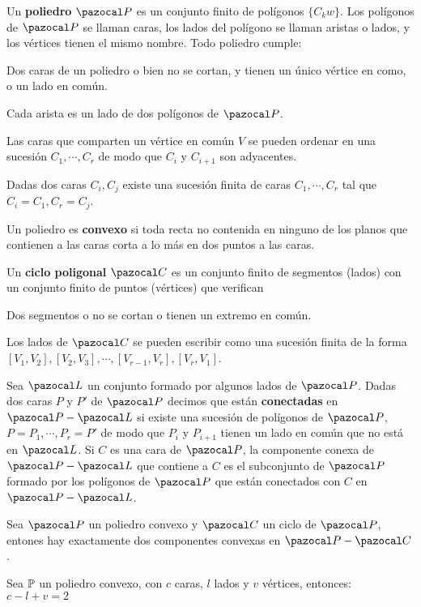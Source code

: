  Un \textbf{poliedro} $\PP$ es un conjunto finito de polígonos $\{C_kw\}$. Los polígonos de $\PP$ se llaman caras, los lados del polígono se llaman aristas o lados, y los vértices tienen el mismo nombre. Todo poliedro cumple:
\begin{itemizex}
	\item Dos caras de un poliedro o bien no se cortan, y tienen un único vértice en como, o un lado en común.
	\item Cada arista es un lado de dos polígonos de $\PP$.
	\item Las caras que comparten un vértice en común $V$ se pueden ordenar en una sucesión $C_1, \cdots, C_r$ de modo que $C_i$ y $C_{i+1}$ son adyacentes. 
	\item Dadas dos caras $C_i, C_j$ existe una sucesión finita de caras $C_1, \cdots, C_r$ tal que $C_i = C_1, C_r = C_j$.
\end{itemizex}

 Un poliedro es \textbf{convexo} si toda recta no contenida en ninguno de los planos que contienen a las caras corta a lo más en dos puntos a las caras.

 Un \textbf{ciclo poligonal} $\C$ es un conjunto finito de segmentos (lados) con un conjunto finito de puntos (vértices) que verifican
\begin{itemizex}
	\item Dos segmentos o no se cortan o tienen un extremo en común.
	\item Los lados de $\C$ se pueden escribir como una sucesión finita de la forma $[V_1,V_2], [V_2,V_3],\cdots, [V_{r-1},V_r],[V_r,V_1]$.
\end{itemizex}

 Sea $\L$ un conjunto formado por algunos lados de $\PP$. Dadas dos caras $P$ y $P'$ de $\PP$ decimos que están \textbf{conectadas} en $\PP - \L$ si existe una sucesión de polígonos de $\PP$, $P = P_1, \cdots, P_r = P'$ de modo que $P_i$ y $P_{i+1}$ tienen un lado en común que no está en $\L$. Si $C$ es una cara de $\PP$, la componente conexa de $\PP - \L$ que contiene a $C$ es el subconjunto de $\PP$ formado por los polígonos de $\PP$ que están conectados con $C$ en $\PP-\L$.

 Sea $\PP$ un poliedro convexo y $\C$ un ciclo de $\PP$, entones hay exactamente dos componentes convexas en $\PP-\C$.

 Sea $\P$ un poliedro convexo, con $c$ caras, $l$ lados y $v$ vértices, entonces:
$c-l+v = 2$

